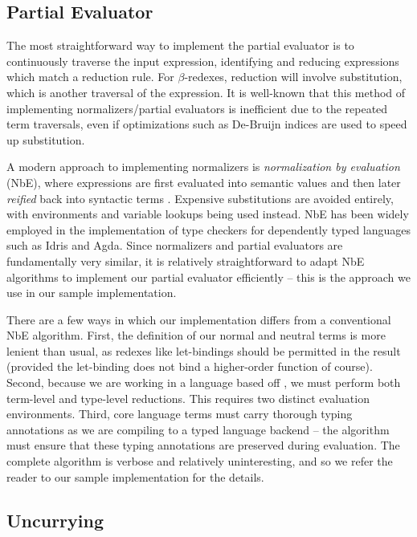 \documentclass[runningheads]{llncs}
\begin{document}

\subsection{Partial Evaluator}

The most straightforward way to implement the partial evaluator is to continuously traverse the input expression, identifying and reducing expressions which match a reduction rule. For $\beta$-redexes, reduction will involve substitution, which is another traversal of the expression. It is well-known that this method of implementing normalizers/partial evaluators is inefficient due to the repeated term traversals, even if optimizations such as De-Bruijn indices \cite{berghofer2007head} are used to speed up substitution.

A modern approach to implementing normalizers is \emph{normalization by evaluation} (NbE), where expressions are first evaluated into semantic values and then later \emph{reified} back into syntactic terms \cite{abel2014normalization, berger1998normalization}. Expensive substitutions are avoided entirely, with environments and variable lookups being used instead. NbE has been widely employed in the implementation of type checkers for dependently typed languages such as Idris and Agda. Since normalizers and partial evaluators are fundamentally very similar, it is relatively straightforward to adapt NbE algorithms to implement our partial evaluator efficiently -- this is the approach we use in our sample implementation.  

There are a few ways in which our implementation differs from a conventional NbE algorithm. First, the definition of our normal and neutral terms is more lenient than usual, as redexes like let-bindings should be permitted in the result (provided the let-binding does not bind a higher-order function of course). Second, because we are working in a language based off \fom{}, we must perform both term-level and type-level reductions. This requires two distinct evaluation environments. Third, core language terms must carry thorough typing annotations as we are compiling to a typed language backend -- the algorithm must ensure that these typing annotations are preserved during evaluation. The complete algorithm is verbose and relatively uninteresting, and so we refer the reader to our sample implementation for the details.


\subsection{Uncurrying}
\end{document}
